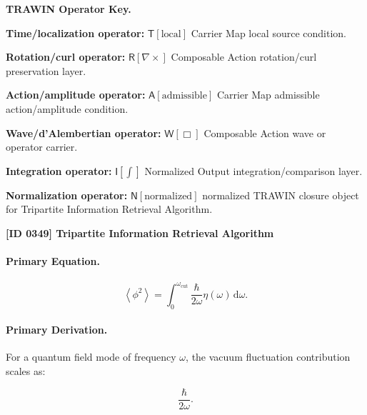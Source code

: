 \par\vspace{0.45\baselineskip}
\noindent\begin{minipage}[t]{\linewidth}
\begingroup
\small
\raggedright
\textbf{TRAWIN Operator Key.}\par
\noindent\textbf{Time/localization operator:} $\mathsf{T}\!\left[\mathrm{local}\right]$ Carrier Map local source condition.\par
\noindent\textbf{Rotation/curl operator:} $\mathsf{R}\!\left[\nabla\times\right]$ Composable Action rotation/curl preservation layer.\par
\noindent\textbf{Action/amplitude operator:} $\mathsf{A}\!\left[\mathrm{admissible}\right]$ Carrier Map admissible action/amplitude condition.\par
\noindent\textbf{Wave/d'Alembertian operator:} $\mathsf{W}\!\left[\Box\right]$ Composable Action wave or operator carrier.\par
\noindent\textbf{Integration operator:} $\mathsf{I}\!\left[\int\right]$ Normalized Output integration/comparison layer.\par
\noindent\textbf{Normalization operator:} $\mathsf{N}\!\left[\mathrm{normalized}\right]$ normalized TRAWIN closure object for Tripartite Information Retrieval Algorithm.\par
\endgroup
\end{minipage}

\clearpage
\noindent\textbf{[ID 0349] Tripartite Information Retrieval Algorithm}\par
\vspace{0.35em}
\paragraph{Primary Equation.}
\begin{equation}
\left\langle\phi^2\right\rangle
=
\int_{0}^{\omega_{\mathrm{cut}}}
\frac{\hbar}{2\omega}
\eta(\omega)
\,\mathrm{d}\omega .
\end{equation}

\paragraph{Primary Derivation.}
For a quantum field mode of frequency $\omega$, the vacuum fluctuation contribution scales as:

\begin{equation}
\frac{\hbar}{2\omega}.
\end{equation}

